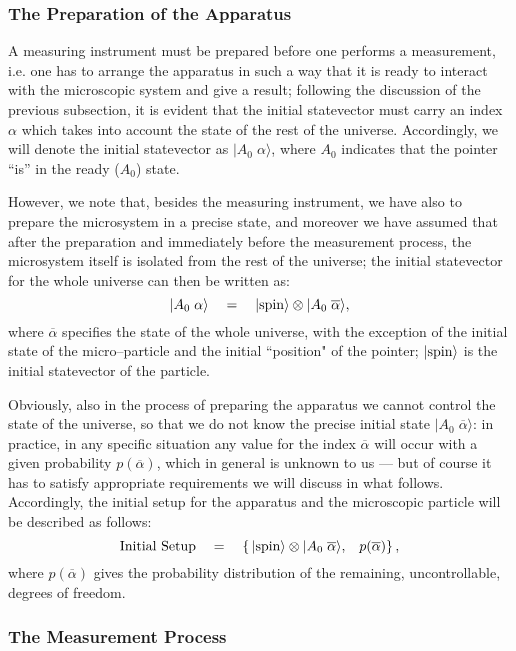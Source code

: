 \documentclass[10pt,a4paper]{article}
\begin{document}
\subsubsection{The Preparation of the Apparatus} \label{sec223}

A measuring instrument must be prepared before one performs a
measurement, i.e. one has to arrange the apparatus in such a way
that it is ready to interact with the microscopic system and give
a result; following the discussion of the previous subsection, it
is evident that the initial statevector must carry an index
$\alpha$ which takes into account the state of the rest of the
universe. Accordingly, we will denote the initial statevector as
$|A_{0}\;\alpha\rangle$, where $A_{0}$ indicates that the pointer
``is'' in the ready ($A_{0}$) state.

However, we note that, besides the measuring instrument, we have
also to prepare the microsystem in a precise state, and moreover
we have assumed that after the preparation and immediately before
the measurement process, the microsystem itself is isolated from
the rest of the universe; the initial statevector for the whole
universe can then be written as:
\[
|A_{0}\;\alpha\rangle \quad =\quad
|\makebox{spin}\rangle\otimes|A_{0}\;\overline{\alpha}\rangle,
\]
where $\overline{\alpha}$ specifies the state of the whole
universe, with the exception of the initial state of the
micro--particle and the initial ``position" of the pointer;
$|\makebox{spin}\rangle$ is the initial statevector of the
particle.

Obviously, also in the process of preparing the apparatus we
cannot control the state of the universe, so that we do not know
the precise initial state $|A_{0}\;\overline{\alpha}\rangle$: in
practice, in any specific situation any value for the index
$\overline{\alpha}$ will occur with a given probability
$p(\overline{\alpha})$, which in general is unknown to us --- but
of course it has to satisfy appropriate requirements  we will
discuss in what follows. Accordingly, the initial setup for the
apparatus and the microscopic particle will be described as
follows:
\[ \makebox{Initial Setup} \quad =\quad \left\{\,
|\makebox{spin}\rangle\otimes|A_{0}\;\overline{\alpha}\rangle,
\;\;\; p(\overline{\alpha}) \right\},
\]
where $p(\overline{\alpha})$ gives the probability distribution of
the remaining, uncontrollable, degrees of freedom.


\subsubsection{The Measurement Process} \label{sec224}
\end{document}
